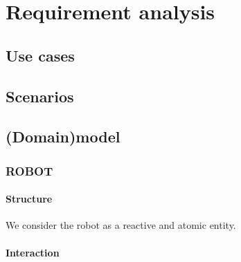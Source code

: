 \documentclass{llncs}
\newcommand{\labelsec}[1]{\label{sec:#1}}
\newcommand{\labelssec}[1]{\label{ssec:#1}}
\begin{document}
 
\section{Requirement analysis}
\labelsec{ReqAnalysis}
\subsection{Use cases}
\labelssec{UseCases}

\subsection{Scenarios}
\labelssec{Scenarios}

\subsection{(Domain)model}
\labelssec{(Domain)model}
\subsubsection{ROBOT}
\paragraph{Structure}
We consider the robot as a reactive and atomic entity.
\paragraph{Interaction}
\end{document}
